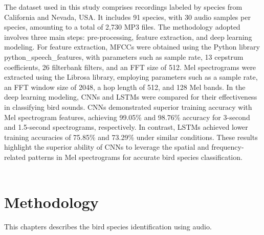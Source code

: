 The dataset used in this study comprises recordings labeled by species from California and Nevada, USA. It includes 91 species, with 30 audio samples per species, amounting to a total of 2,730 MP3 files. The methodology adopted involves three main steps: pre-processing, feature extraction, and deep learning modeling.
For feature extraction, MFCCs were obtained using the Python library python\_speech\_features, with parameters such as sample rate, 13 cepstrum coefficients, 26 filterbank filters, and an FFT size of 512. Mel spectrograms were extracted using the Librosa library, employing parameters such as a sample rate, an FFT window size of 2048, a hop length of 512, and 128 Mel bands.
In the deep learning modeling, CNNs and LSTMs were compared for their effectiveness in classifying bird sounds. CNNs demonstrated superior training accuracy with Mel spectrogram features, achieving 99.05\% and 98.76\% accuracy for 3-second and 1.5-second spectrograms, respectively. In contrast, LSTMs achieved lower training accuracies of 75.85\% and 73.29\% under similar conditions.
These results highlight the superior ability of CNNs to leverage the spatial and frequency-related patterns in Mel spectrograms for accurate bird species classification.\cite{carvalho2023automatic}\\ \\

\chapter{Methodology}
This chapters describes the bird species identification using audio.

